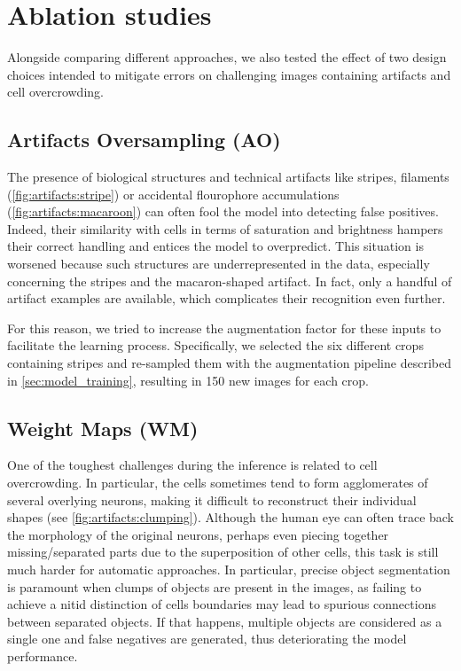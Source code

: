 \section{Ablation studies}
\label{sec:ablation_studies}

Alongside comparing different approaches, we also tested the effect of two design choices intended to mitigate errors on challenging images containing artifacts and cell overcrowding.

\subsection{Artifacts Oversampling (AO)}

The presence of biological structures and technical artifacts like stripes, filaments (\cref{fig:artifacts:stripe}) or accidental flourophore accumulations (\cref{fig:artifacts:macaroon})  can often fool the model into detecting false positives.
Indeed, their similarity with cells in terms of saturation and brightness hampers their correct handling and entices the model to overpredict.
This situation is worsened because such structures are underrepresented in the data, especially concerning the stripes and the macaron-shaped artifact.
In fact, only a handful of artifact examples are available, which complicates their recognition even further.

For this reason, we tried to increase the augmentation factor for these inputs to facilitate the learning process.
Specifically, we selected the six different crops containing stripes and re-sampled them with the augmentation pipeline described in \cref{sec:model_training}, resulting in 150 new images for each crop.

\subsection{Weight Maps (WM)} \label{sec:weights_map}

One of the toughest challenges during the inference is related to cell overcrowding.
In particular, the cells sometimes tend to form agglomerates of several overlying neurons, making it difficult to reconstruct their individual shapes (see \cref{fig:artifacts:clumping}).
Although the human eye can often trace back the morphology of the original neurons, perhaps even piecing together missing/separated parts due to the superposition of other cells, this task is still much harder for automatic approaches.
In particular, precise object segmentation is paramount when clumps of objects are present in the images, as failing to achieve a nitid distinction of cells boundaries may lead to spurious connections between separated objects. 
If that happens, multiple objects are considered as a single one and false negatives are generated, thus deteriorating the model performance.

